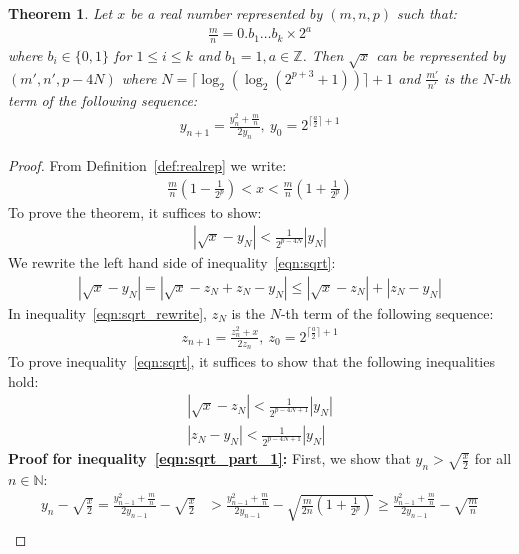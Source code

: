 \documentclass{article}
\newcommand{\nat}{\mathbb{N}}
\newcommand{\integer}{\mathbb{Z}}
\newcommand{\sqrtexp}{\log_2(\log_2(2^{p+3}+1))}
\newtheorem{mytheorem}{Theorem}
\numberwithin{mytheorem}{section}
\begin{document}
\begin{mytheorem}\label{thm:sqrt}
Let $x$ be a real number represented by $(m,n,p)$ such that:
\begin{align*}
\frac{m}{n}=0.b_1\ldots b_k\times 2^a
\end{align*}
where $b_i\in\{0,1\}$ for $1\leq i\leq k$ and $b_1=1, a\in \integer$. Then $\sqrt{x}$ can be represented by $(m',n',p-4N)$ where $N=\lceil \sqrtexp\rceil+1$ and $\frac{m'}{n'}$ is the $N$-th term of the following sequence:
\begin{align*}
y_{n+1}=\frac{y_n^2+\frac{m}{n}}{2y_n},~y_0=2^{\lceil\frac{a}{2} \rceil +1}
\end{align*}

\end{mytheorem}

\begin{proof}
From Definition~\ref{def:realrep} we write:
\begin{align*}
\frac{m}{n}(1-\frac{1}{2^{p}})<x<\frac{m}{n}(1+\frac{1}{2^{p}})
\end{align*}
To prove the theorem, it suffices to show:
\begin{align}
|\sqrt{x}-y_N|<\frac{1}{2^{p-4N}}|y_N|\label{eqn:sqrt}
\end{align}
We rewrite the left hand side of inequality~\eqref{eqn:sqrt}:
\begin{align}
|\sqrt{x}-y_N|=|\sqrt{x}-z_N+z_N-y_N|\leq |\sqrt{x}-z_N|+|z_N-y_N|\label{eqn:sqrt_rewrite}
\end{align}
In inequality~\eqref{eqn:sqrt_rewrite}, $z_N$ is the $N$-th term of the following sequence:
\begin{align*}
z_{n+1}=\frac{z_n^2+x}{2z_n},~z_0=2^{\lceil\frac{a}{2} \rceil+1}
\end{align*}
To prove inequality~\eqref{eqn:sqrt}, it suffices to show that the following inequalities hold:
\begin{align}
|\sqrt{x}-z_N|<\frac{1}{2^{p-4N+1}}|y_N|\label{eqn:sqrt_part_1}\\
|z_N-y_N|<\frac{1}{2^{p-4N+1}}|y_N|\label{eqn:sqrt_part_2}
\end{align}
\textbf{Proof for inequality~\eqref{eqn:sqrt_part_1}:} 
First, we show that $y_n>\sqrt{\frac{x}{2}}$ for all $n\in \nat$:
\begin{align*}
y_n-\sqrt{\frac{x}{2}}=\frac{y_{n-1}^2+\frac{m}{n}}{2y_{n-1}}-\sqrt{\frac{x}{2}}&>\frac{y_{n-1}^2+\frac{m}{n}}{2y_{n-1}}-\sqrt{\frac{m}{2n}(1+\frac{1}{2^p})}\geq \frac{y_{n-1}^2+\frac{m}{n}}{2y_{n-1}}-\sqrt{\frac{m}{n}}\\

\end{align*}
\end{proof}
\end{document}
